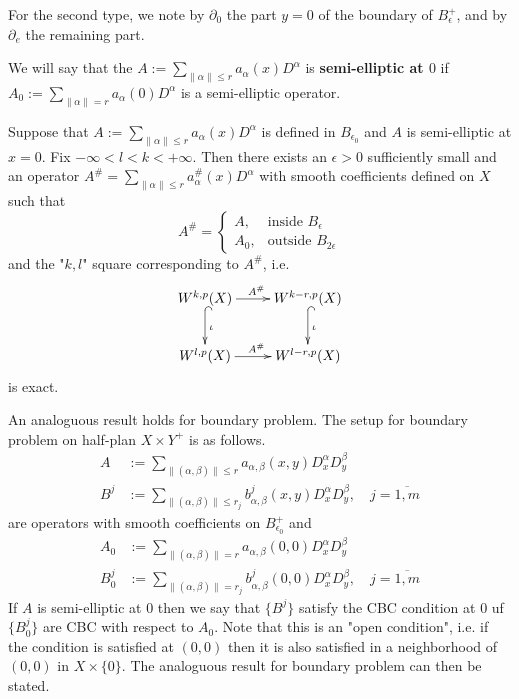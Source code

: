 For the second type, we note by \(\partial_0\) the part \(y=0\) of the boundary of \(B^+_\epsilon\), and by \(\partial_e\) the remaining part.

We will say that the \(A:= \sum_{\|\alpha\|\leq r}a_{\alpha}(x) D^\alpha\) is
\textbf{semi-elliptic at \(0\)} if \(A_0:=  \sum_{\|\alpha\|= r}a_{\alpha}(0) D^\alpha\) is a
semi-elliptic operator.

\begin{proposition}
\label{prop:interior-cube}
Suppose that \(A:=  \sum_{\|\alpha\|\leq r}a_{\alpha}(x) D^\alpha\) is defined in \(B_{\epsilon_0}\) and \(A\) is semi-elliptic at \(x = 0\). Fix \(-\infty < l <k <+\infty\). Then there exists an \(\epsilon>0\) sufficiently small and an operator \(A^\# =  \sum_{\|\alpha\|\leq
r}a^\#_{\alpha}(x) D^\alpha\) with smooth coefficients defined on \(X\) such that
\[
 A^\# = \begin{cases}
A       ,  & \text{inside $B_\epsilon$} \\
A_0       , & \text{outside $B_{2\epsilon}$}
       \end{cases}
\]
and the "\(k,l\)" square corresponding to \(A^\#\), i.e.
\[
 \xymatrix{
W^{k,p}(X) \ar@{->}[r]^{A^\#} \ar@{^{(}->}[d]^{\iota} & W^{k-r,p}(X) \ar@{^{(}->}[d]^{\iota} \\
W^{l,p}(X) \ar@{->}[r]^{A^\#} & W^{l-r,p}(X)
}
\]
is exact.
\end{proposition}

An analoguous result holds for boundary problem. The setup for boundary problem on
half-plan \(X\times Y^+\) is as follows.
\begin{align*}
  A &:=  \sum_{\|(\alpha,\beta)\|\leq r}a_{\alpha,\beta}(x,y) D^\alpha_x D^\beta_y \\
  B^j &:=  \sum_{\|(\alpha,\beta)\|\leq r_j}b^j_{\alpha,\beta}(x,y) D^\alpha_x D^\beta_y,\quad j=\overline{1,m}
\end{align*}
are operators with smooth coefficients on \(B^+_{\epsilon_0}\) and
\begin{align*}
  A_0 &:=  \sum_{\|(\alpha,\beta)\|= r}a_{\alpha,\beta}(0,0) D^\alpha_x D^\beta_y \\
  B^j_0 &:=  \sum_{\|(\alpha,\beta)\|= r_j}b^j_{\alpha,\beta}(0,0) D^\alpha_x D^\beta_y,\quad j=\overline{1,m}
\end{align*}
If \(A\) is semi-elliptic at \(0\) then we say that \(\{B^j\}\) satisfy the CBC
condition at \(0\) uf \(\{B^j_0\}\) are CBC with respect to \(A_0\). Note that this
is an "open condition", i.e. if the condition is satisfied at \((0,0)\) then it is also
satisfied in a neighborhood of \((0,0)\) in \(X\times \{0\}\). The analoguous result
for boundary problem can then be stated.


